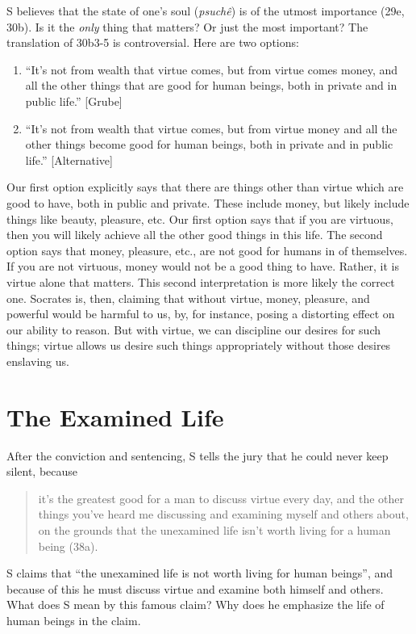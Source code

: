 \documentclass[oneside]{article}
\begin{document}
S believes that the state of one's soul (\emph{psuch\^{e}}) is of the utmost importance (29e, 30b). Is it the \emph{only} thing that matters? Or just the most important? The translation of 30b3-5 is controversial. Here are two options:
\begin{enumerate}
\item ``It's not from wealth that virtue comes, but from virtue comes money, and all the other things that are good for human beings, both in private and in public life.'' [Grube]
\item  ``It's not from wealth that virtue comes, but from virtue money and all the other things become good for human beings, both in private and in public life.'' [Alternative]
\end{enumerate}
Our first option explicitly says that there are things other than virtue which are good to have, both in public and private. These include money, but likely include things like beauty, pleasure, etc. Our first option says that if you are virtuous, then you will likely achieve all the other good things in this life. The second option says that money, pleasure, etc., are not good for humans in of themselves. If you are not virtuous, money would not be a good thing to have. Rather, it is virtue alone that matters. This second interpretation is more likely the correct one. Socrates is, then, claiming that without virtue, money, pleasure, and powerful would be harmful to us, by, for instance, posing a distorting effect on our ability to reason. But with virtue, we can discipline our desires for such things; virtue allows us desire such things appropriately without those desires enslaving us. 

\section*{The Examined Life}

After the conviction and sentencing, S tells the jury that he could never keep silent, because
\begin{quote}
it’s the greatest good for a man to discuss virtue every day, and the other things you’ve heard me discussing and examining myself and others about, on the grounds that the unexamined life isn’t worth living for a human being (38a).
\end{quote}
S claims that ``the unexamined life is not worth living for human beings'', and because of this he must discuss virtue and examine both himself and others. What does S mean by this famous claim? Why does he emphasize the life of human beings in the claim. 
\end{document}
